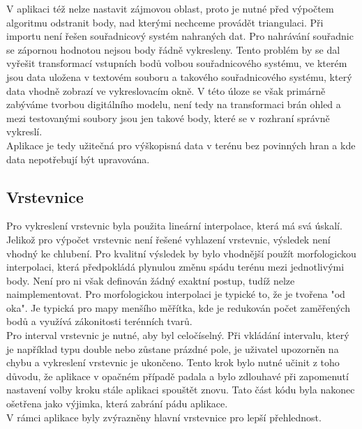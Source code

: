 \documentclass[a4paper, 12pt]{article}
\begin{document}
V aplikaci též nelze nastavit zájmovou oblast, proto je nutné před výpočtem algoritmu odstranit body, nad kterými nechceme provádět triangulaci. Při importu není řešen souřadnicový systém nahraných dat. Pro nahrávání souřadnic se zápornou hodnotou nejsou body řádně vykresleny. Tento problém by se dal vyřešit transformací vstupních bodů volbou souřadnicového systému, ve kterém jsou data uložena v textovém souboru a takového souřadnicového systému, který data vhodně zobrazí ve vykreslovacím okně. V této úloze se však primárně zabýváme tvorbou digitálního modelu, není tedy na transformaci brán ohled a mezi testovanými soubory jsou jen takové body, které se v rozhraní správně vykreslí. \\

Aplikace je tedy užitečná pro výškopisná data v terénu bez povinných hran a kde data nepotřebují být upravována.\\

\subsection{Vrstevnice}
Pro vykreslení vrstevnic byla použita lineární interpolace, která má svá úskalí. Jelikož pro výpočet vrstevnic není řešené vyhlazení vrstevnic, výsledek není vhodný ke chlubení. Pro kvalitní výsledek by bylo vhodnější použít morfologickou interpolaci, která předpokládá plynulou změnu spádu terénu mezi jednotlivými body. Není pro ni však definován žádný exaktní postup, tudíž nelze naimplementovat. Pro morfologickou interpolaci je typické to, že je tvořena "od oka". Je typická pro mapy menšího měřítka, kde je redukován počet zaměřených bodů a využívá zákonitosti terénních tvarů. \\

Pro interval vrstevnic je nutné, aby byl celočíselný. Při vkládání intervalu, který je například typu double nebo zůstane prázdné pole, je uživatel upozorněn na chybu a vykreslení vrstevnic je ukončeno. Tento krok bylo nutné učinit z toho důvodu, že aplikace v opačném případě padala a bylo zdlouhavé při zapomenutí nastavení volby kroku stále aplikaci spouštět znovu. Tato část kódu byla nakonec ošetřena jako výjimka, která zabrání pádu aplikace. \\

V rámci aplikace byly zvýrazněny hlavní vrstevnice pro lepší přehlednost. 
\end{document}
